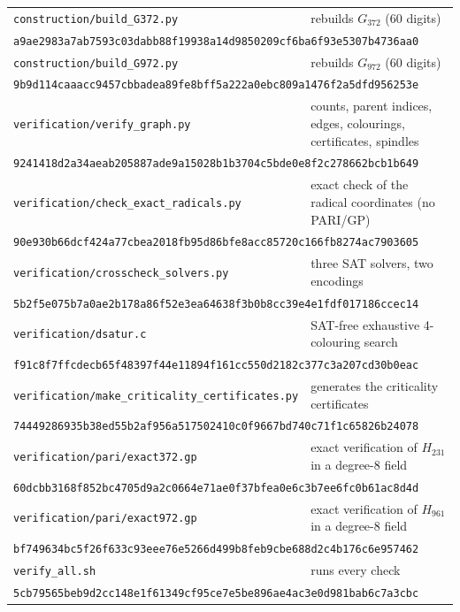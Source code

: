 \documentclass[10pt]{article}
\begin{document}
{\begin{longtable}{p{}p{}}
\texttt{construction/build\_G372.py} & rebuilds $G_{372}$ (60 digits) \\ \multicolumn{2}{l}{\scriptsize\texttt{a9ae2983a7ab7593c03dabb88f19938a14d9850209cf6ba6f93e5307b4736aa0}} \\
\texttt{construction/build\_G972.py} & rebuilds $G_{972}$ (60 digits) \\ \multicolumn{2}{l}{\scriptsize\texttt{9b9d114caaacc9457cbbadea89fe8bff5a222a0ebc809a1476f2a5dfd956253e}} \\
\texttt{verification/verify\_graph.py} & counts, parent indices, edges, colourings, certificates, spindles \\ \multicolumn{2}{l}{\scriptsize\texttt{9241418d2a34aeab205887ade9a15028b1b3704c5bde0e8f2c278662bcb1b649}} \\
\texttt{verification/check\_exact\_radicals.py} & exact check of the radical coordinates (no PARI/GP) \\ \multicolumn{2}{l}{\scriptsize\texttt{90e930b66dcf424a77cbea2018fb95d86bfe8acc85720c166fb8274ac7903605}} \\
\texttt{verification/crosscheck\_solvers.py} & three SAT solvers, two encodings \\ \multicolumn{2}{l}{\scriptsize\texttt{5b2f5e075b7a0ae2b178a86f52e3ea64638f3b0b8cc39e4e1fdf017186ccec14}} \\
\texttt{verification/dsatur.c} & SAT-free exhaustive 4-colouring search \\ \multicolumn{2}{l}{\scriptsize\texttt{f91c8f7ffcdecb65f48397f44e11894f161cc550d2182c377c3a207cd30b0eac}} \\
\texttt{verification/make\_criticality\_certificates.py} & generates the criticality certificates \\ \multicolumn{2}{l}{\scriptsize\texttt{74449286935b38ed55b2af956a517502410c0f9667bd740c71f1c65826b24078}} \\
\texttt{verification/pari/exact372.gp} & exact verification of $H_{231}$ in a degree-8 field \\ \multicolumn{2}{l}{\scriptsize\texttt{60dcbb3168f852bc4705d9a2c0664e71ae0f37bfea0e6c3b7ee6fc0b61ac8d4d}} \\
\texttt{verification/pari/exact972.gp} & exact verification of $H_{961}$ in a degree-8 field \\ \multicolumn{2}{l}{\scriptsize\texttt{bf749634bc5f26f633c93eee76e5266d499b8feb9cbe688d2c4b176c6e957462}} \\
\texttt{verify\_all.sh} & runs every check \\ \multicolumn{2}{l}{\scriptsize\texttt{5cb79565beb9d2cc148e1f61349cf95ce7e5be896ae4ac3e0d981bab6c7a3cbc}} \\
\bottomrule
\end{longtable}}
\end{document}
